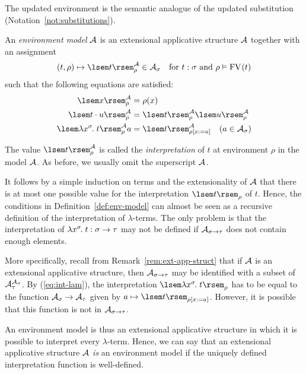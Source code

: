 The updated environment is the semantic analogue of the updated substitution (Notation~\ref{not:substitutions}).

\begin{defn} \label{def:env-model}
An \emph{environment model} $\mathcal{A}$ is an extensional applicative structure $\mathcal{A}$ together with an assignment
\[ (t, \rho) \mapsto \sint[\struct{A}]{t}{\rho} \in \scomp{\struct{A}}{\sigma}
    \quad \text{for }\typedtm{t}{\sigma} \text{ and } \typedenv{\rho}{\FV{t}} \]
such that the following equations are satisfied:
\begin{align}
\sint[\struct{A}]{x}{\rho} &= \rho(x) \\
\sint[\struct{A}]{\app{t}{u}}{\rho} &= \sint[\struct{A}]{t}{\rho}\sint[\struct{A}]{u}{\rho} \\
\sint[\struct{A}]{\lamv{x}{\sigma}{t}}{\rho} a &= \sint[\struct{A}]{t}{\updenv{\rho}{x}{a}} \label{eq:int-lam} \quad (a \in \scomp{\struct{A}}{\sigma})
\end{align}
\end{defn}

The value $\sint[\struct{A}]{t}{\rho}$ is called the \emph{interpretation} of $t$ at environment $\rho$ in the model $\mathcal{A}$. As before, we usually omit the superscript $\mathcal{A}$.

\begin{rem} \label{rem:env-model-int-uniq}
It follows by a simple induction on terms and the extensionality of $\mathcal{A}$ that there is at most one possible value for the interpretation $\sint{t}{\rho}$ of $t$. Hence, the conditions in Definition~\ref{def:env-model} can almost be seen as a recursive definition of the interpretation of $\lambda$-terms. The only problem is that the interpretation of $\lambda x^{\sigma}\hspace{-1pt}.\;t : \sigma \to \tau$ may not be defined if $\mathcal{A}_{\sigma \to \tau}$ does not contain enough elements.

More specifically, recall from Remark~\ref{rem:ext-app-struct} that if $\mathcal{A}$ is an extensional applicative structure, then $\mathcal{A}_{\sigma \to \tau}$ may be identified with a subset of $\mathcal{A}_{\tau}^{\mathcal{A}_{\sigma}}$. By (\ref{eq:int-lam}), the interpretation $\sint{\lamv{x}{\sigma}{t}}{\rho}$ has to be equal to the function $\mathcal{A}_{\sigma} \to \mathcal{A}_{\tau}$ given by $a \mapsto \sint{t}{\updenv{\rho}{x}{a}}$. However, it is possible that this function is not in $\mathcal{A}_{\sigma \to \tau}$.

An environment model is thus an extensional applicative structure in which it is possible to interpret every $\lambda$-term. Hence, we can say that an extensional applicative structure $\mathcal{A}$ \textit{is} an environment model if the uniquely defined interpretation function is well-defined.
\end{rem}

